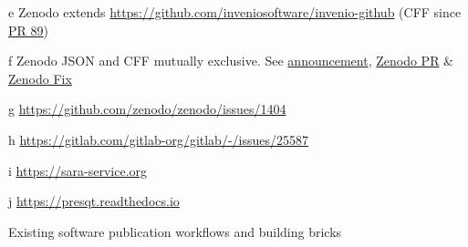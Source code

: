 \documentclass[../document.tex]{subfiles}
\begin{document}
\begin{table}[htp]
\begin{threeparttable}
\begin{tablenotes}
            \item[e]        Zenodo extends \url{https://github.com/inveniosoftware/invenio-github} (CFF since \href{https://github.com/inveniosoftware/invenio-github/pull/89}{PR 89})
            \item[f]        Zenodo JSON and CFF mutually exclusive. See \href{https://twitter.com/ZENODO_ORG/status/1420357001490706442}{announcement},
                            \href{https://github.com/zenodo/zenodo/pull/2201}{Zenodo PR} \& \href{https://github.com/zenodo/zenodo/commit/a806d10700a504cc86abaf9eb961dc201b3d8fe8}{Zenodo Fix}
            \item[g]        \url{https://github.com/zenodo/zenodo/issues/1404}
            \item[h]        \url{https://gitlab.com/gitlab-org/gitlab/-/issues/25587}
            \item[i]        \url{https://sara-service.org}        
            \item[j]        \url{https://presqt.readthedocs.io}
        \end{tablenotes}
    \end{threeparttable}
    
    \caption{Existing software publication workflows and building bricks}
    \label{tab:workflows}
\end{table}
\end{document}
